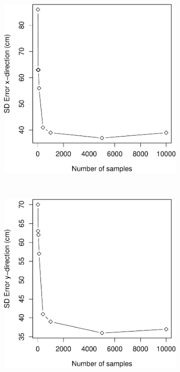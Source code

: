 \documentclass[11pt]{report}
\begin{document}
\begin{figure}[H]
\begin{subfigure}[b]{0.45\textwidth}
  \end{subfigure}
  \begin{subfigure}[b]{0.45\textwidth}
  \includegraphics[width=1\textwidth]{SD_x_samples-crop}
  \end{subfigure}%
~
  \begin{subfigure}[b]{0.45\textwidth}
  \includegraphics[width=1\textwidth]{SD_y_samples-crop}

\end{subfigure}
\end{figure}
\end{document}
